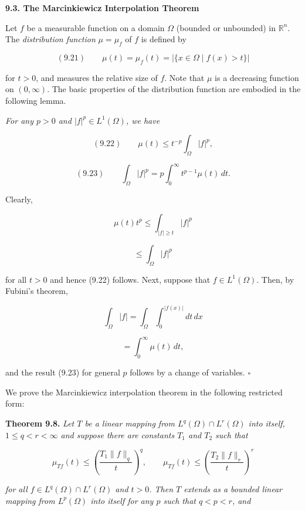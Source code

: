 \centerline{\bf 9.3. The Marcinkiewicz Interpolation Theorem}

\medskip

Let $f$ be a measurable function on a domain $\Omega$ (bounded or unbounded) in $\mathbb{R}^{n}$. The
\emph{distribution function} $\mu = \mu_{f}$ of $f$ is defined by

\[
(9.21)\qquad \mu(t) = \mu_{f}(t) = |\{x \in \Omega \mid f(x) > t\}|
\]

for $t > 0$, and measures the relative size of $f$. Note that $\mu$ is a decreasing function on
$(0, \infty)$. The basic properties of the distribution function are embodied in the following
lemma.

\medskip

 \emph{For any $p > 0$ and $|f|^{p} \in L^{1}(\Omega)$, we have}

\[
(9.22)\qquad \mu(t) \leq t^{-p}\int_{\Omega} |f|^{p},
\]

\[
(9.23)\qquad \int_{\Omega} |f|^{p} = p\int_{0}^{\infty} t^{p-1}\mu(t)\,dt.
\]

 Clearly,

\[
\mu(t)t^{p} \leq \int_{|f|\geq t} |f|^{p}
\]

\[
\leq \int_{\Omega} |f|^{p}
\]

for all $t > 0$ and hence (9.22) follows. Next, suppose that $f \in L^{1}(\Omega)$. Then, by
Fubini’s theorem,

\[
\int_{\Omega} |f| = \int_{\Omega}\int_{0}^{|f(x)|} dt\,dx
\]

\[
= \int_{0}^{\infty}\mu(t)\,dt,
\]

and the result (9.23) for general $p$ follows by a change of variables. \hfill$\square$


We prove the Marcinkiewicz interpolation theorem in the following restricted form:

\textbf{Theorem 9.8.}
\emph{Let $T$ be a linear mapping from $L^q(\Omega)\cap L^r(\Omega)$ into itself, $1 \le q < r < \infty$ and suppose there are constants $T_1$ and $T_2$ such that}

\begin{equation}\tag{9.24}
\mu_{Tf}(t) \le \left(\frac{T_1\|f\|_q}{t}\right)^q,\qquad
\mu_{Tf}(t) \le \left(\frac{T_2\|f\|_r}{t}\right)^r
\end{equation}

\emph{for all $f \in L^q(\Omega)\cap L^r(\Omega)$ and $t > 0$. Then $T$ extends as a bounded linear mapping from $L^p(\Omega)$ into itself for any $p$ such that $q < p < r$, and}

